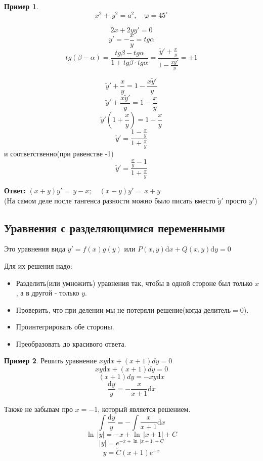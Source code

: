 \documentclass[a4paper, 14pt]{article}
\newcommand{\dx}{\mathrm{d}x}
\newcommand{\dy}{\mathrm{d}y}
\renewcommand{\phi}{\varphi}
\theoremstyle{definition}
\newtheorem*{example}{Пример}
\newenvironment{answer}
  {\par\noindent\textbf{Ответ:}}
  {\par}
\begin{document}
\begin{example}

\[x^2 +\,y^2 = a^2, \quad \phi = 45^{\circ}\]

\[2x + 2yy' = 0\]
\[y' = -\frac{x}{y} = tg{\alpha}\]
\[tg{(\beta - \alpha)} = \frac{tg{\beta} - tg{\alpha}}{1 + tg{\beta}\cdot tg{\alpha}} = \frac{\tilde{y}' + \frac{x}{y}}{1-\frac{x\tilde{y}'}{y}}= \pm 1\]


\[\tilde{y}' + \frac{x}{y} = 1-\frac{x\tilde{y}'}{y}\]
\[\tilde{y}' + \frac{x\tilde{y}'}{y} = 1 - \frac{x}{y}\]
\[\tilde{y}'(1 + \frac{x}{y}) = 1 - \frac{x}{y}\]
\[\tilde{y}' = \frac{1 - \frac{x}{y}}{1 + \frac{x}{y}}\] и соответственно(при равенстве -1) \[\tilde{y}' = \frac{\frac{x}{y} - 1}{1 + \frac{x}{y}}\]
\end{example}
\begin{answer}
$(x+y)y' =\,y - x; \quad (x-y)y' =\,x + y$\\
(На самом деле после тангенса разности можно было писать вместо $\tilde{y}'$ просто $y'$)
\end{answer} 

\subsection{Уравнения с разделяющимися переменными}

Это уравнения вида $y' = f(x)g(y)$ или $P(x, y)\dx + Q(x, y)\dy = 0$
\medskip

Для их решения надо:
\begin{itemize}
\item \textbf{}Разделить(или умножить) уравнения так, чтобы в одной стороне был только $x$, а в другой - только $y$.
\item \textbf{}Проверить, что при делении мы не потеряли решение(когда делитель$=0$).
\item \textbf{}Проинтегрировать обе стороны.
\item \textbf{}Преобразовать до красивого ответа.
\end{itemize}
\begin{example}
Решить уравнение $xy\dx+(x+1)dy=0$
\[xy\dx+(x+1)dy=0\]
\[(x+1)dy = -xy\dx\]
\[\frac{\dy}{y} = - \frac{x}{x+1}\dx\] 

Также не забывам про $x=-1$, который является решением.
\[\int \frac{\dy}{y} = - \int \frac{x}{x+1}\dx\]
\[\ln{\,|y|} = -x + \ln{\,|x+1| + C}\]
\[|y| = e^{-x + \ln{\,|x+1| + C}}\]
\[y = \tilde{C}(x+1)e^{-x}\]
\end{example}
\end{document}
